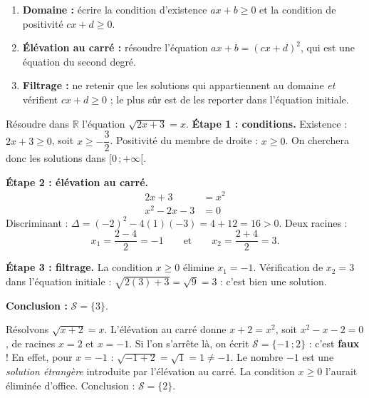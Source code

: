 \documentclass[11pt]{article}
\begin{document}
\begin{methode}[Résoudre $\sqrt{ax+b} = cx+d$]
\begin{enumerate}
\item \textbf{Domaine :} écrire la condition d'existence $ax+b \geq 0$ et la condition de positivité $cx+d \geq 0$.
\item \textbf{Élévation au carré :} résoudre l'équation $ax+b = (cx+d)^2$, qui est une équation du second degré.
\item \textbf{Filtrage :} ne retenir que les solutions qui appartiennent au domaine \emph{et} vérifient $cx+d \geq 0$ ; le plus sûr est de les reporter dans l'équation initiale.
\end{enumerate}
\end{methode}

\begin{exoresolu}[Résoudre $\sqrt{2x+3} = x$]
Résoudre dans $\mathbb{R}$ l'équation $\sqrt{2x+3} = x$.
\tcblower
\textbf{Étape 1 : conditions.} Existence : $2x+3 \geq 0$, soit $x \geq -\dfrac{3}{2}$. Positivité du membre de droite : $x \geq 0$. On cherchera donc les solutions dans $[0 \, ; +\infty[$.

\textbf{Étape 2 : élévation au carré.}
\begin{align*}
2x+3 &= x^2 \\
x^2 - 2x - 3 &= 0
\end{align*}
Discriminant : $\Delta = (-2)^2 - 4(1)(-3) = 4 + 12 = 16 > 0$. Deux racines :
\[ x_1 = \frac{2 - 4}{2} = -1 \qquad \text{et} \qquad x_2 = \frac{2+4}{2} = 3. \]

\textbf{Étape 3 : filtrage.} La condition $x \geq 0$ élimine $x_1 = -1$. Vérification de $x_2 = 3$ dans l'équation initiale : $\sqrt{2(3)+3} = \sqrt{9} = 3$ : c'est bien une solution.

\textbf{Conclusion :} $\mathcal{S} = \{3\}$.
\end{exoresolu}

\begin{attention}
Résolvons $\sqrt{x+2} = x$. L'élévation au carré donne $x+2 = x^2$, soit $x^2 - x - 2 = 0$, de racines $x = 2$ et $x = -1$. Si l'on s'arrête là, on écrit $\mathcal{S} = \{-1 \, ; 2\}$ : c'est \textbf{faux} ! En effet, pour $x = -1$ : $\sqrt{-1+2} = \sqrt{1} = 1 \neq -1$. Le nombre $-1$ est une \emph{solution étrangère} introduite par l'élévation au carré. La condition $x \geq 0$ l'aurait éliminée d'office. Conclusion : $\mathcal{S} = \{2\}$.
\end{attention}
\end{document}
